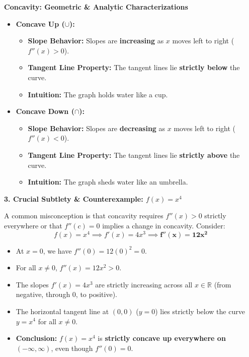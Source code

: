 \documentclass[10.5pt]{article}
\begin{document}
\begin{tcolorbox}[colback=boxbg, colframe=boxframe, boxrule=0.8pt, arc=3pt, left=8pt, right=8pt, top=4pt, bottom=4pt]
\textbf{\large Concavity: Geometric \& Analytic Characterizations}
\begin{itemize}[leftmargin=1.2em, topsep=2pt, itemsep=5pt]
  \item \textbf{Concave Up ($\cup$):}
  \begin{itemize}[label=--]
    \item \textbf{Slope Behavior:} Slopes are \textbf{increasing} as $x$ moves left to right ($f''(x) > 0$).
    \item \textbf{Tangent Line Property:} The tangent lines lie \textbf{strictly below} the curve.
    \item \textbf{Intuition:} The graph holds water like a cup.
  \end{itemize}
  \item \textbf{Concave Down ($\cap$):}
  \begin{itemize}[label=--]
    \item \textbf{Slope Behavior:} Slopes are \textbf{decreasing} as $x$ moves left to right ($f''(x) < 0$).
    \item \textbf{Tangent Line Property:} The tangent lines lie \textbf{strictly above} the curve.
    \item \textbf{Intuition:} The graph sheds water like an umbrella.
  \end{itemize}
\end{itemize}
\end{tcolorbox}

\vspace{0.04in}

\textbf{\large 3. Crucial Subtlety \& Counterexample: $f(x) = x^4$}

A common misconception is that concavity requires $f''(x) > 0$ strictly everywhere or that $f''(c) = 0$ implies a change in concavity. Consider:
\[
  f(x) = x^4 \implies f'(x) = 4x^3 \implies \mathbf{f''(x) = 12x^2}
\]
\begin{itemize}[leftmargin=1.2em, topsep=1pt, itemsep=3pt]
  \item At $x = 0$, we have $f''(0) = 12(0)^2 = 0$.
  \item For all $x \ne 0$, $f''(x) = 12x^2 > 0$.
  \item The slopes $f'(x) = 4x^3$ are strictly increasing across all $x \in \mathbb{R}$ (from negative, through $0$, to positive).
  \item The horizontal tangent line at $(0,0)$ ($y=0$) lies strictly below the curve $y=x^4$ for all $x \ne 0$.
  \item \textbf{Conclusion:} $f(x) = x^4$ is \textbf{strictly concave up everywhere on $(-\infty, \infty)$}, even though $f''(0) = 0$.
\end{itemize}
\end{document}
